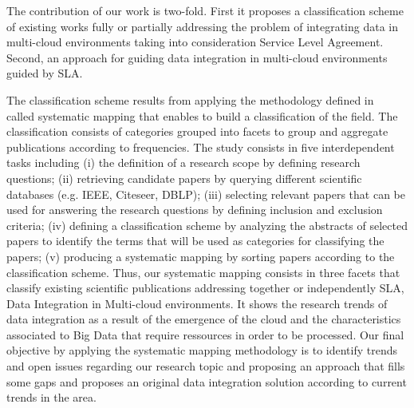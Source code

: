 The contribution of our work is two-fold. First it proposes a classification scheme of existing works fully or partially addressing the problem of integrating data in multi-cloud environments taking into consideration Service Level Agreement. Second, an approach for guiding data integration in multi-cloud environments guided by SLA. 

The classification scheme results from  applying the  methodology defined in~\cite{SM:Petersen:2008} called  systematic mapping  that enables to build a classification of the field. The classification consists of categories grouped into facets  to group and aggregate  publications according to frequencies. The study consists in  five interdependent tasks including (i) the definition of a research scope by defining research questions; (ii) retrieving candidate papers by querying different scientific databases (e.g. IEEE, Citeseer, DBLP); (iii) selecting relevant papers that can be used for answering the research questions by defining inclusion and exclusion criteria; (iv) defining a classification scheme by  analyzing the abstracts of selected papers to identify the terms that will be used as categories for classifying the papers; (v) producing a systematic mapping by sorting papers according to the classification scheme. Thus, our systematic mapping consists in three facets that classify existing scientific publications addressing  together or independently SLA, Data Integration in Multi-cloud environments. It shows the research trends of data integration as a result of the emergence of the cloud and the characteristics associated to Big Data that require ressources in order to be processed. Our final objective by applying the systematic mapping methodology is to identify trends and open issues regarding our research topic and proposing an approach that fills some gaps and proposes an original data integration solution according to current trends in the area. 




